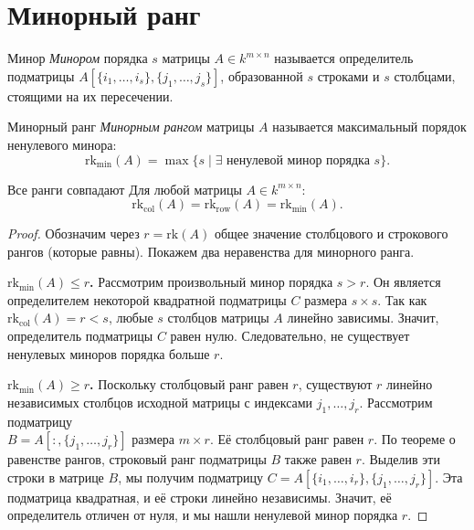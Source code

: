 
\section{Минорный ранг}

\begin{Definition}{Минор}{}
	\emph{Минором} порядка $s$ матрицы $A \in k^{m \times n}$ называется определитель подматрицы $A[\{i_1,\ldots,i_s\},\{j_1,\ldots,j_s\}]$, образованной $s$ строками и $s$ столбцами, стоящими на их пересечении.
\end{Definition}

\begin{Definition}{Минорный ранг}{}
	\emph{Минорным рангом} матрицы $A$ называется максимальный порядок ненулевого минора:
	\[
	\mathrm{rk}_{\mathrm{min}}(A) = \max\{s \mid \exists \text{ ненулевой минор порядка } s\}.
	\]
\end{Definition}

\begin{Theorem}{Все ранги совпадают}{}
	Для любой матрицы $A \in k^{m \times n}$:
	\[
	\mathrm{rk}_{\mathrm{col}}(A) = \mathrm{rk}_{\mathrm{row}}(A) = \mathrm{rk}_{\mathrm{min}}(A).
	\]
\end{Theorem}

\begin{proof}
	Обозначим через $r = \mathrm{rk}(A)$ общее значение столбцового и строкового рангов (которые равны). Покажем два неравенства для минорного ранга.
	
	\textbf{$\mathrm{rk}_{\mathrm{min}}(A) \leq r$.} 
	Рассмотрим произвольный минор порядка $s > r$. Он является определителем некоторой квадратной подматрицы $C$ размера $s \times s$. Так как $\mathrm{rk}_{\mathrm{col}}(A) = r < s$, любые $s$ столбцов матрицы $A$ линейно зависимы. Значит, определитель подматрицы $C$ равен нулю. Следовательно, не существует ненулевых миноров порядка больше $r$.
	
	\textbf{$\mathrm{rk}_{\mathrm{min}}(A) \geq r$.} 
	Поскольку столбцовый ранг равен $r$, существуют $r$ линейно независимых столбцов исходной матрицы с индексами $j_1, \ldots, j_r$. Рассмотрим подматрицу \\ $B = A[{:},\{j_1,\ldots,j_r\}]$ размера $m \times r$. 
	Её столбцовый ранг равен $r$. По теореме о равенстве рангов, строковый ранг подматрицы $B$ также равен $r$.
	Выделив эти строки в матрице $B$, мы получим подматрицу $C = A[\{i_1,\ldots,i_r\},\{j_1,\ldots,j_r\}]$. Эта подматрица квадратная, и её строки линейно независимы. Значит, её определитель отличен от нуля, и мы нашли ненулевой минор порядка $r$.
\end{proof}
